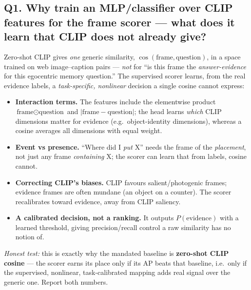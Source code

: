 \documentclass[11pt]{article}
\begin{document}
\subsection*{Q1. Why train an MLP/classifier over CLIP features for the frame scorer --- what does it learn that CLIP does not already give?}
Zero-shot CLIP gives \emph{one} generic similarity, $\cos(\text{frame},\text{question})$, in a space trained on web image--caption pairs --- \emph{not} for ``is this frame the \emph{answer-evidence} for this egocentric memory question.'' The supervised scorer learns, from the real evidence labels, a \emph{task-specific, nonlinear} decision a single cosine cannot express:
\begin{itemize}[leftmargin=1.3em,topsep=1pt,itemsep=1pt]
\item \textbf{Interaction terms.} The features include the elementwise product $\text{frame}\odot\text{question}$ and $|\text{frame}-\text{question}|$; the head learns \emph{which} CLIP dimensions matter for evidence (e.g.\ object-identity dimensions), whereas a cosine averages all dimensions with equal weight.
\item \textbf{Event vs presence.} ``Where did I \emph{put} X'' needs the frame of the \emph{placement}, not just any frame \emph{containing} X; the scorer can learn that from labels, cosine cannot.
\item \textbf{Correcting CLIP's biases.} CLIP favours salient/photogenic frames; evidence frames are often mundane (an object on a counter). The scorer recalibrates toward evidence, away from CLIP saliency.
\item \textbf{A calibrated decision, not a ranking.} It outputs $P(\text{evidence})$ with a learned threshold, giving precision/recall control a raw similarity has no notion of.
\end{itemize}
\emph{Honest test:} this is exactly why the mandated baseline is \textbf{zero-shot CLIP cosine} --- the scorer earns its place only if its AP beats that baseline, i.e.\ only if the supervised, nonlinear, task-calibrated mapping adds real signal over the generic one. Report both numbers.
\end{document}
